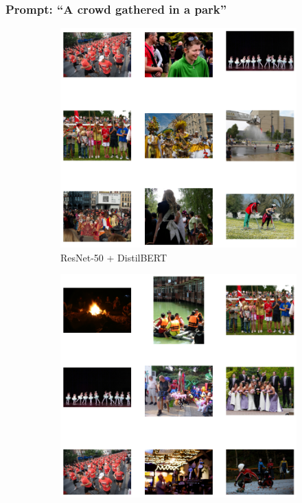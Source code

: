 \documentclass[11pt]{article}
\begin{document}
\subsubsection{Prompt: ``A crowd gathered in a park''}
\vspace{0.5em}

\begin{figure}[H]
    \centering
    \begin{subfigure}[b]{0.3\textwidth}
        \includegraphics[width=\linewidth]{Q2/A crowd gathered in a park/1.png}
        \caption{\tiny ResNet-50 + DistilBERT}
    \end{subfigure}
    \hfill
    \begin{subfigure}[b]{0.3\textwidth}
        \includegraphics[width=\linewidth]{Q2/A crowd gathered in a park/2.png}

\end{subfigure}
\end{figure}
\end{document}
